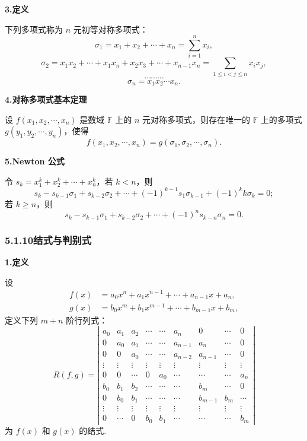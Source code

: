 \documentclass[UTF8, 12pt, fontset=fandol, oneside]{ctexart}
\begin{document}
\noindent\textbf{3.\quad 定义}

下列多项式称为 $n$ 元初等对称多项式：
\[
\sigma_1=x_1+x_2+\cdots+x_n=\sum_{i=1}^n x_i,
\]
\[
\sigma_2=x_1x_2+\cdots+x_1x_n+x_2x_3+\cdots+x_{n-1}x_n
=\sum_{1\le i<j\le n}x_ix_j,
\]
\[
\cdots\cdots\cdots
\]
\[
\sigma_n=x_1x_2\cdots x_n.
\]

\noindent\textbf{4.\quad 对称多项式基本定理}

设 $f(x_1,x_2,\cdots,x_n)$ 是数域 $\mathbb{F}$ 上的 $n$ 元对称多项式，则存在唯一的 $\mathbb{F}$ 上的多项式 $g(y_1,y_2,\cdots,y_n)$，使得
\[
f(x_1,x_2,\cdots,x_n)=g(\sigma_1,\sigma_2,\cdots,\sigma_n).
\]

\noindent\textbf{5.\quad Newton 公式}

令 $s_k=x_1^k+x_2^k+\cdots+x_n^k$，若 $k<n$，则
\[
s_k-s_{k-1}\sigma_1+s_{k-2}\sigma_2+\cdots+(-1)^{k-1}s_1\sigma_{k-1}+(-1)^k k\sigma_k=0;
\]
若 $k\ge n$，则
\[
s_k-s_{k-1}\sigma_1+s_{k-2}\sigma_2+\cdots+(-1)^n s_{k-n}\sigma_n=0.
\]

\subsubsection*{5.1.10\quad 结式与判别式}

\noindent\textbf{1.\quad 定义}

设
\[
\begin{aligned}
f(x)&=a_0x^n+a_1x^{n-1}+\cdots+a_{n-1}x+a_n,\\
g(x)&=b_0x^m+b_1x^{m-1}+\cdots+b_{m-1}x+b_m,
\end{aligned}
\]
定义下列 $m+n$ 阶行列式：
\[
R(f,g)=
\left|\begin{array}{ccccccccc}
a_0 & a_1 & a_2 & \cdots & \cdots & a_n & 0 & \cdots & 0\\
0 & a_0 & a_1 & \cdots & \cdots & a_{n-1} & a_n & \cdots & 0\\
0 & 0 & a_0 & \cdots & \cdots & a_{n-2} & a_{n-1} & \cdots & 0\\
\vdots & \vdots & \vdots & \vdots & \vdots & \vdots & \vdots & \vdots & \vdots\\
0 & 0 & \cdots & 0 & a_0 & \cdots & \cdots & \cdots & a_n\\
b_0 & b_1 & b_2 & \cdots & \cdots & \cdots & b_m & \cdots & 0\\
0 & b_0 & b_1 & \cdots & \cdots & \cdots & b_{m-1} & b_m & \cdots\\
\vdots & \vdots & \vdots & \vdots & \vdots & \vdots & \vdots & \vdots & \vdots\\
0 & \cdots & 0 & b_0 & b_1 & \cdots & \cdots & \cdots & b_m
\end{array}\right|
\]
为 $f(x)$ 和 $g(x)$ 的结式.
\end{document}
